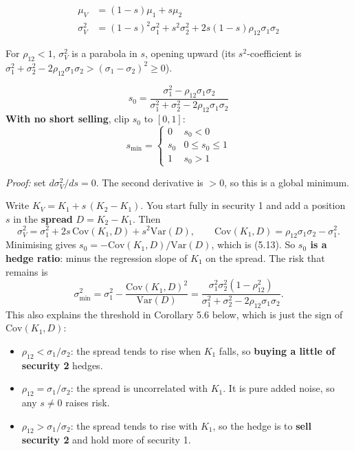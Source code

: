 \documentclass[titlepage,11pt,a4paper]{article}
\newcommand{\Var}{\mathrm{Var}}
\newcommand{\Cov}{\mathrm{Cov}}
\begin{document}
\begin{result}[Two-security portfolio line in terms of $s=w_2$]
\begin{align}
\mu_V&=(1-s)\mu_1+s\mu_2 \tag{5.11}\\
\sigma_V^2&=(1-s)^2\sigma_1^2+s^2\sigma_2^2+2s(1-s)\rho_{12}\sigma_1\sigma_2 \tag{5.12}
\end{align}
\end{result}

For $\rho_{12}<1$, $\sigma_V^2$ is a parabola in $s$, opening upward (its $s^2$-coefficient is $\sigma_1^2+\sigma_2^2-2\rho_{12}\sigma_1\sigma_2>(\sigma_1-\sigma_2)^2\ge0$).

\begin{result}
\[s_0=\frac{\sigma_1^2-\rho_{12}\sigma_1\sigma_2}{\sigma_1^2+\sigma_2^2-2\rho_{12}\sigma_1\sigma_2} \tag{5.13}\]
\textbf{With no short selling}, clip $s_0$ to $[0,1]$:
\[s_{\min}=\begin{cases}0 & s_0<0\\ s_0 & 0\le s_0\le1\\ 1 & s_0>1\end{cases}\]
\end{result}

\emph{Proof:} set $d\sigma_V^2/ds=0$. The second derivative is $>0$, so this is a global minimum.

\begin{intuition}
Write $K_V=K_1+s\,(K_2-K_1)$. You start fully in security 1 and add a position $s$ in the \textbf{spread} $D=K_2-K_1$. Then
\[\sigma_V^2=\sigma_1^2+2s\,\Cov(K_1,D)+s^2\Var(D),\qquad \Cov(K_1,D)=\rho_{12}\sigma_1\sigma_2-\sigma_1^2.\]
Minimising gives $s_0=-\Cov(K_1,D)/\Var(D)$, which is (5.13). So \textbf{$s_0$ is a hedge ratio}: minus the regression slope of $K_1$ on the spread. The risk that remains is
\[\sigma_{\min}^2=\sigma_1^2-\frac{\Cov(K_1,D)^2}{\Var(D)}=\frac{\sigma_1^2\sigma_2^2(1-\rho_{12}^2)}{\sigma_1^2+\sigma_2^2-2\rho_{12}\sigma_1\sigma_2}.\]
This also explains the threshold in Corollary 5.6 below, which is just the sign of $\Cov(K_1,D)$:
\begin{itemize}
  \item $\rho_{12}<\sigma_1/\sigma_2$: the spread tends to rise when $K_1$ falls, so \textbf{buying a little of security 2} hedges.
  \item $\rho_{12}=\sigma_1/\sigma_2$: the spread is uncorrelated with $K_1$. It is pure added noise, so any $s\ne0$ raises risk.
  \item $\rho_{12}>\sigma_1/\sigma_2$: the spread tends to rise with $K_1$, so the hedge is to \textbf{sell security 2} and hold more of security 1.
\end{itemize}
\end{intuition}
\end{document}
